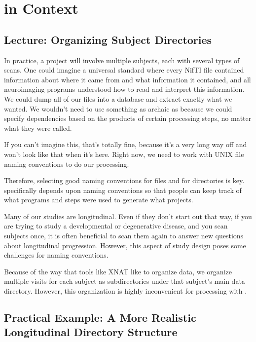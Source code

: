 \chapter{ \maken{} in Context}

\section{Lecture: Organizing Subject Directories }
In practice, a project will involve multiple subjects, each with
several types of scans. One could imagine a universal standard where
every NifTI file contained information about where it came from and
what information it contained, and all neuroimaging programs
understood how to read and interpret this information. We could dump
all of our files into a database and extract exactly what we
wanted. We wouldn't need to use something as archaic as \maken{} because
we could specify dependencies based on the products of certain
processing steps, no matter what they were called.

If you can't imagine this, that's totally fine, because it's a very
long way off and won't look like that when it's here. Right now, we
need to work with UNIX file naming conventions to do our processing.

Therefore, selecting good naming conventions for files and for
directories is key. \maken{} specifically depends upon naming
conventions so that people can keep track of what programs and steps
were used to generate what projects.


Many of our studies are longitudinal. Even if they don't start out
that way, if you are trying to study a developmental or degenerative
disease, and you scan subjects once, it is often beneficial to scan
them again to answer new questions about longitudinal
progression. However, this aspect of study design poses some
challenges for naming conventions. 

Because of the way that tools like XNAT like to organize data, we
organize multiple visits for each subject as subdirectories under that
subject's main data directory. However, this organization is highly
inconvenient for processing with \maken{}.  


\section{Practical Example: A More Realistic Longitudinal Directory Structure}

